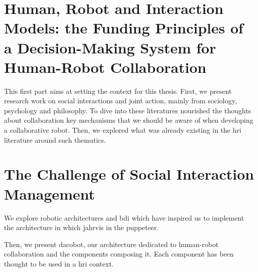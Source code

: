 \documentclass[english,a4paper,11pt,twoside]{StyleThese}
\begin{document}

\tableofcontents

\printnoidxglossary[type=\acronymtype]
%



\mainmatter
{}

\fancyhead[RE]{\bfseries\nouppercase{\leftmark}}      %
\fancyhead[LO]{\bfseries\nouppercase{\rightmark}}     %

\part{Human, Robot and Interaction Models: the Funding Principles of a Decision-Making System for Human-Robot Collaboration}\label{part:part1}
\begin{partintro}
	This first part aims at setting the context for this thesis. First, we present research work on social interactions and joint action, mainly from sociology, psychology and philosophy. To dive into these literatures nourished the thoughts about collaboration key mechanisms that we should be aware of when developing a collaborative robot. Then, we explored what was already existing in the \acrlong{hri} literature around such thematics.
\end{partintro}


\part{The Challenge of Social Interaction Management}\label{part:part2}
\begin{partintro}
	We explore robotic architectures and \acrfull{bdi} which have inspired us to implement the architecture in which \acrshort{jahrvis} in the puppeteer.
	
	Then, we present \acrfull{dacobot}, our architecture dedicated to human-robot collaboration and the components composing it. Each component has been thought to be used in a \acrshort{hri} context.
\end{partintro}	


\end{document}

